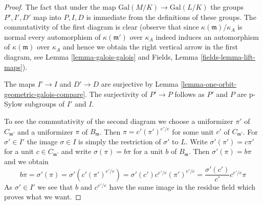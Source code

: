 \documentclass[10pt,a4paper]{amsart}
\theoremstyle{plain}
\theoremstyle{definition}
\theoremstyle{remark}
\numberwithin{equation}{subsection}
\begin{document}
\begin{proof}
The fact that under the map $\text{Gal}(M/K) \to \text{Gal}(L/K)$
the groups $P', I', D'$ map into $P, I, D$ is immediate from the
definitions of these groups. The commutativity of the first diagram
is clear (observe that since $\kappa(\mathfrak m)/\kappa_A$ is normal
every automorphism of $\kappa(\mathfrak m')$ over $\kappa_A$ indeed
induces an automorphism of $\kappa(\mathfrak m)$ over $\kappa_A$
and hence we obtain the right vertical arrow in the first diagram, see
Lemma \ref{lemma-galois-galois} and
Fields, Lemma \ref{fields-lemma-lift-maps}).

\medskip\noindent
The maps $I' \to I$ and $D' \to D$ are surjective by
Lemma \ref{lemma-one-orbit-geometric-galois-compare}.
The surjectivity of $P' \to P$ follows as $P'$ and $P$
are p-Sylow subgroups of $I'$ and $I$.

\medskip\noindent
To see the commutativity of the second diagram we choose a uniformizer
$\pi'$ of $C_{\mathfrak m'}$ and a uniformizer $\pi$ of $B_\mathfrak m$.
Then $\pi = c' (\pi')^{e'/e}$ for some unit $c'$ of $C_{\mathfrak m'}$.
For $\sigma' \in I'$ the image $\sigma \in I$ is simply the restriction
of $\sigma'$ to $L$. Write $\sigma'(\pi') = c \pi'$ for a unit
$c \in C_{\mathfrak m'}$ and write
$\sigma(\pi) = b \pi$ for a unit $b$ of $B_\mathfrak m$.
Then $\sigma'(\pi) = b \pi$ and we obtain
$$
b \pi = \sigma'(\pi) = \sigma'(c' (\pi')^{e'/e}) =
\sigma'(c') c^{e'/e} (\pi')^{e'/e} =
\frac{\sigma'(c')}{c'} c^{e'/e} \pi
$$
As $\sigma' \in I'$ we see that $b$ and $c^{e'/e}$ have the same
image in the residue field which proves what we want.
\end{proof}
\end{document}
